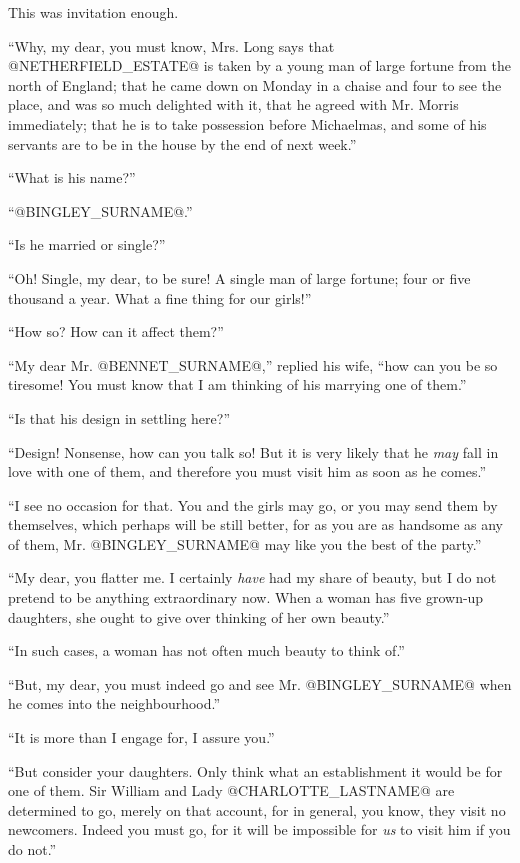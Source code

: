 This was invitation enough.

``Why, my dear, you must know, Mrs. Long says that @NETHERFIELD_ESTATE@ is taken
by a young man of large fortune from the north of England; that he came
down on Monday in a chaise and four to see the place, and was so much
delighted with it, that he agreed with Mr. Morris immediately; that he
is to take possession before Michaelmas, and some of his servants are to
be in the house by the end of next week.''

``What is his name?''

``@BINGLEY_SURNAME@.''

``Is he married or single?''

``Oh! Single, my dear, to be sure! A single man of large fortune; four or
five thousand a year. What a fine thing for our girls!''

``How so? How can it affect them?''

``My dear Mr. @BENNET_SURNAME@,'' replied his wife, ``how can you be so tiresome! You
must know that I am thinking of his marrying one of them.''

``Is that his design in settling here?''

``Design! Nonsense, how can you talk so! But it is very likely that he
\textit{may} fall in love with one of them, and therefore you must visit him as
soon as he comes.''

``I see no occasion for that. You and the girls may go, or you may send
them by themselves, which perhaps will be still better, for as you are
as handsome as any of them, Mr. @BINGLEY_SURNAME@ may like you the best of the
party.''

``My dear, you flatter me. I certainly \textit{have} had my share of beauty, but
I do not pretend to be anything extraordinary now. When a woman has five
grown-up daughters, she ought to give over thinking of her own beauty.''

``In such cases, a woman has not often much beauty to think of.''

``But, my dear, you must indeed go and see Mr. @BINGLEY_SURNAME@ when he comes into
the neighbourhood.''

``It is more than I engage for, I assure you.''

``But consider your daughters. Only think what an establishment it would
be for one of them. Sir William and Lady @CHARLOTTE_LASTNAME@ are determined to
go, merely on that account, for in general, you know, they visit no
newcomers. Indeed you must go, for it will be impossible for \textit{us} to
visit him if you do not.''

